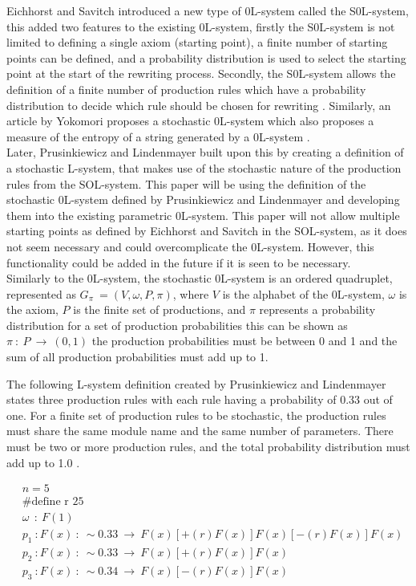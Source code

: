 Eichhorst and Savitch introduced a new type of 0L-system called the S0L-system, this added two features to the existing 0L-system, firstly the S0L-system is not limited to defining a single axiom (starting point), a finite number of starting points can be defined, and a probability distribution is used to select the starting point at the start of the rewriting process. Secondly, the S0L-system allows the definition of a finite number of production rules which have a probability distribution to decide which rule should be chosen for rewriting \cite{eichhorst1980growth}. Similarly, an article by Yokomori proposes a stochastic 0L-system which also proposes a measure of the entropy of a string generated by a 0L-system \cite{yokomori1980stochastic}.\\
Later, Prusinkiewicz and Lindenmayer built upon this by creating a definition of a stochastic L-system, that makes use of the stochastic nature of the production rules from the SOL-system. This paper will be using the definition of the stochastic 0L-system defined by Prusinkiewicz and Lindenmayer and developing them into the existing parametric 0L-system. This paper will not allow multiple starting points as defined by Eichhorst and Savitch in the SOL-system, as it does not seem necessary and could overcomplicate the 0L-system. However, this functionality could be added in the future if it is seen to be necessary. \\
Similarly to the 0L-system, the stochastic 0L-system is an ordered quadruplet, represented as $G_\pi~ = (V, \omega, P, \pi)$, where $V$ is the alphabet of the 0L-system, $\omega$ is the axiom, $P$ is the finite set of productions, and $\pi$ represents a probability distribution for a set of production probabilities this can be shown as $\pi~ :~ P~ \rightarrow~ (0, 1)$ the production probabilities must be between 0 and 1 and the sum of all production probabilities must add up to 1.

The following L-system definition created by Prusinkiewicz and Lindenmayer states three production rules with each rule having a probability of 0.33 out of one. For a finite set of production rules to be stochastic, the production rules must share the same module name and the same number of parameters. There must be two or more production rules, and the total probability distribution must add up to 1.0 \cite{prusinkiewicz2012algorithmic}.

\begin{equation} \label{stochastic example}
\begin{aligned}
	&n=5\\
	&\text{\#define r 25}\\
	&\omega~~ :~ F(1)\\
	&p_1~ :  F(x)~ :~ \sim 0.33 ~ \rightarrow~ F(x)[+(r)F(x)]F(x)[-(r)F(x)]F(x)\\
	&p_2~ :  F(x)~ :~ \sim 0.33 ~ \rightarrow~ F(x)[+(r)F(x)]F(x)\\
	&p_3~ :  F(x)~ :~ \sim 0.34 ~ \rightarrow~ F(x)[-(r)F(x)]F(x)\\
\end{aligned}
\end{equation}

